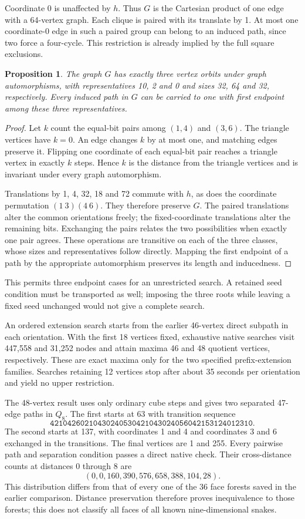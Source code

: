 \documentclass[11pt,a4paper]{article}
\newtheorem{proposition}[theorem]{Proposition}
\theoremstyle{definition}
\theoremstyle{remark}
\begin{document}
Coordinate 0 is unaffected by $h$. Thus $G$ is the Cartesian product
of one edge with a 64-vertex graph. Each clique is paired with its
translate by 1. At most one coordinate-0 edge in such a paired group
can belong to an induced path, since two force a four-cycle. This
restriction is already implied by the full square exclusions.

\begin{proposition}
The graph $G$ has exactly three vertex orbits under graph automorphisms,
with representatives 10, 2 and 0 and sizes 32, 64 and 32, respectively.
Every induced path in $G$ can be carried to one with first endpoint
among these three representatives.
\end{proposition}
\begin{proof}
Let $k$ count the equal-bit pairs among $(1,4)$ and $(3,6)$.
The triangle vertices have $k=0$. An edge changes $k$ by at most one,
and matching edges preserve it. Flipping one coordinate of each
equal-bit pair reaches a triangle vertex in exactly $k$ steps.
Hence $k$ is the distance from the triangle vertices and is invariant
under every graph automorphism.

Translations by 1, 4, 32, 18 and 72 commute with $h$, as does the
coordinate permutation $(1\ 3)(4\ 6)$. They therefore preserve $G$.
The paired translations alter the common orientations freely;
the fixed-coordinate translations alter the remaining bits. Exchanging
the pairs relates the two possibilities when exactly one pair agrees.
These operations are transitive on each of the three classes, whose
sizes and representatives follow directly. Mapping the first endpoint
of a path by the appropriate automorphism preserves its length and
inducedness.
\end{proof}
This permits three endpoint cases for an unrestricted search. A retained
seed condition must be transported as well; imposing the three roots
while leaving a fixed seed unchanged would not give a complete search.

An ordered extension search starts from the earlier 46-vertex direct
subpath in each orientation. With the first 18 vertices fixed, exhaustive
native searches visit 447,558 and 31,252 nodes and attain maxima 46 and
48 quotient vertices, respectively. These are exact maxima only for the
two specified prefix-extension families. Searches retaining 12 vertices
stop after about 35 seconds per orientation and yield no upper restriction.

The 48-vertex result uses only ordinary cube steps and gives two
separated 47-edge paths in $Q_8$. The first starts at 63 with transition
sequence
\[
\mathtt{42104260210430240530421043024056042153124012310}.
\]
The second starts at 137, with coordinates 1 and 4 and coordinates 3
and 6 exchanged in the transitions. The final vertices are 1 and 255.
Every pairwise path and separation condition passes a direct native check.
Their cross-distance counts at distances 0 through 8 are
\[
(0,0,160,390,576,658,388,104,28).
\]
This distribution differs from that of every one of the 36 face forests
saved in the earlier comparison. Distance preservation therefore proves
inequivalence to those forests; this does not classify all faces of all
known nine-dimensional snakes.
\end{document}
